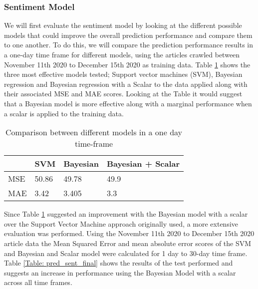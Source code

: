             \subsubsection{Sentiment Model} We will first evaluate the sentiment model by looking at the different possible models that could improve the overall prediction performance and compare them to one another. To do this, we will compare the prediction performance results in a one-day time frame for different models, using the articles crawled between November 11th 2020 to December 15th 2020 as training data. Table \ref{Table: pred_sent_model} shows the three most effective models tested; Support vector machines (SVM), Bayesian regression and Bayesian regression with a Scalar to the data applied along with their associated MSE and MAE scores. Looking at the Table it would suggest that a Bayesian model is more effective along with a marginal performance when a scalar is applied to the training data.
            
            \begin{table}[h]
            \centering
            \begin{tabular}{|l|l|l|l|} 
            \cline{2-4}
            \multicolumn{1}{l|}{} & \textbf{SVM} & \textbf{Bayesian} & \textbf{Bayesian + Scalar}  \\ 
            \hline
            MSE                   & 50.86                      & 49.78             & 49.9                        \\ 
            \hline
            MAE                   & 3.42                       & 3.405             & 3.3                         \\
            \hline
            \end{tabular}
            \caption{Comparison between different models in a one day time-frame}
            \bigskip
            \label{Table: pred_sent_model}
            \end{table}
            
            Since Table \ref{Table: pred_sent_model} suggested an improvement with the Bayesian model with a scalar over the Support Vector Machine approach originally used, a more extensive evaluation was performed. Using the November 11th 2020 to December 15th 2020 article data the Mean Squared Error and mean absolute error scores of the SVM and Bayesian and Scalar model were calculated for 1 day to 30-day time frame. Table \ref{Table: pred_sent_final} shows the results of the test performed and suggests an increase in performance using the Bayesian Model with a scalar across all time frames. 
            
